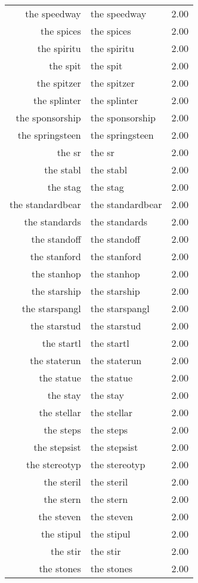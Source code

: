 \begin{table}[ht]
\begin{tabular}{rlr}
  the speedway & the speedway & 2.00 \\ 
  the spices & the spices & 2.00 \\ 
  the spiritu & the spiritu & 2.00 \\ 
  the spit & the spit & 2.00 \\ 
  the spitzer & the spitzer & 2.00 \\ 
  the splinter & the splinter & 2.00 \\ 
  the sponsorship & the sponsorship & 2.00 \\ 
  the springsteen & the springsteen & 2.00 \\ 
  the sr & the sr & 2.00 \\ 
  the stabl & the stabl & 2.00 \\ 
  the stag & the stag & 2.00 \\ 
  the standardbear & the standardbear & 2.00 \\ 
  the standards & the standards & 2.00 \\ 
  the standoff & the standoff & 2.00 \\ 
  the stanford & the stanford & 2.00 \\ 
  the stanhop & the stanhop & 2.00 \\ 
  the starship & the starship & 2.00 \\ 
  the starspangl & the starspangl & 2.00 \\ 
  the starstud & the starstud & 2.00 \\ 
  the startl & the startl & 2.00 \\ 
  the staterun & the staterun & 2.00 \\ 
  the statue & the statue & 2.00 \\ 
  the stay & the stay & 2.00 \\ 
  the stellar & the stellar & 2.00 \\ 
  the steps & the steps & 2.00 \\ 
  the stepsist & the stepsist & 2.00 \\ 
  the stereotyp & the stereotyp & 2.00 \\ 
  the steril & the steril & 2.00 \\ 
  the stern & the stern & 2.00 \\ 
  the steven & the steven & 2.00 \\ 
  the stipul & the stipul & 2.00 \\ 
  the stir & the stir & 2.00 \\ 
  the stones & the stones & 2.00 \\ 

\end{tabular}
\end{table}
